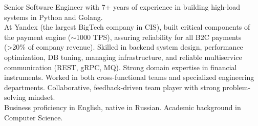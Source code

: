 
\begin{cvparagraph}
Senior Software Engineer with 7+ years of experience in building high-load systems in Python and Golang.\\
At Yandex (the largest BigTech company in CIS), built critical components of the payment engine ($\sim$1000 TPS), assuring reliability for all B2C payments (>20\% of company revenue).
Skilled in backend system design, performance optimization, DB tuning, managing infrastructure, and reliable multiservice communication (REST, gRPC, MQ). Strong domain expertise in financial instruments.
Worked in both cross-functional teams and specialized engineering departments. Collaborative, feedback-driven team player with strong problem-solving mindset.\\
Business proficiency in English, native in Russian. Academic background in Computer Science.
\end{cvparagraph}
